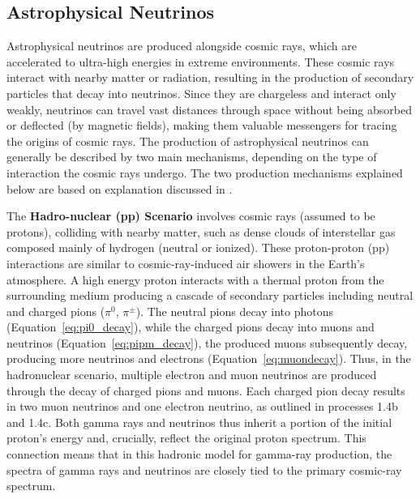 \subsection{Astrophysical Neutrinos}
\label{sec:astro_nu}
Astrophysical neutrinos are produced alongside cosmic rays, which are accelerated to ultra-high energies in extreme environments. These cosmic rays interact with nearby matter or radiation, resulting in the production of secondary particles that decay into neutrinos. Since they are chargeless and interact only weakly, neutrinos can travel vast distances through space without being absorbed or deflected (by magnetic fields), making them valuable messengers for tracing the origins of cosmic rays. The production of astrophysical neutrinos can generally be described by two main mechanisms, depending on the type of interaction the cosmic rays undergo. The two production mechanisms explained below are based on explanation discussed in .

The \textbf{Hadro-nuclear (pp) Scenario} involves cosmic rays (assumed to be protons), colliding with nearby matter, such as dense clouds of interstellar gas composed mainly of hydrogen (neutral or ionized). These proton-proton (pp) interactions are similar to cosmic-ray-induced air showers in the Earth's atmosphere. A high energy proton interacts with a thermal proton from the surrounding medium producing a cascade of secondary particles  including neutral and charged pions ($\pi^0$, $\pi^\pm$). The neutral pions decay into photons (Equation~\ref{eq:pi0_decay}), while the charged pions decay into muons and neutrinos (Equation~\ref{eq:pipm_decay}), the produced muons subsequently decay, producing more neutrinos and electrons (Equation~\ref{eq:muondecay}). Thus, in the hadronuclear scenario, multiple electron and muon neutrinos are produced through the decay of charged pions and muons. Each charged pion decay results in two muon neutrinos and one electron neutrino, as outlined in processes 1.4b and 1.4c. Both gamma rays and neutrinos thus inherit a portion of the initial proton's energy and, crucially, reflect the original proton spectrum. This connection means that in this hadronic model for gamma-ray production, the spectra of gamma rays and neutrinos are closely tied to the primary cosmic-ray spectrum.

